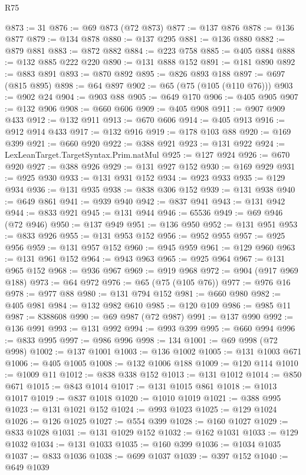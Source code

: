 \begin{lexlean}{R75}
\begin{coremodule}
@873 := 31
@876 := @69 @873 (@72 @873)
@877 := @137 @876
@878 := @136 @877
@879 := @134 @878
@880 := @137 @295
@881 := @136 @880
@882 := @879 @881
@883 := @872 @882
@884 := @223 @758
@885 := @405 @884
@888 := @132 @885 @222 @220
@890 := @131 @888 @152
@891 := @181 @890
@892 := @883 @891
@893 := @870 @892
@895 := @826 @893 @188
@897 := @697 (@815 @895)
@898 := @64 @897
@902 := @65 (@75 (@105 (@110 @76)))
@903 := @902 @24
@904 := @903 @88
@905 := @649 @170
@906 := @405 @905
@907 := @132 @906
@908 := @660 @606
@909 := @405 @908
@911 := @907 @909 @433
@912 := @132 @911
@913 := @670 @606
@914 := @405 @913
@916 := @912 @914 @433
@917 := @132 @916
@919 := @178 @103 @88
@920 := @169 @399
@921 := @660 @920
@922 := @388 @921
@923 := @131 @922
@924 := LexLeanTarget.TargetSyntax.Prim.natMul
@925 := @127 @924
@926 := @670 @920
@927 := @388 @926
@929 := @131 @927 @152
@930 := @169 @929
@931 := @925 @930
@933 := @131 @931 @152
@934 := @923 @933
@935 := @129 @934
@936 := @131 @935
@938 := @838 @306 @152
@939 := @131 @938
@940 := @649 @861
@941 := @939 @940
@942 := @837 @941
@943 := @131 @942
@944 := @833 @921
@945 := @131 @944
@946 := 65536
@949 := @69 @946 (@72 @946)
@950 := @137 @949
@951 := @136 @950
@952 := @131 @951
@953 := @833 @926
@955 := @131 @953 @152
@956 := @952 @955
@957 := @925 @956
@959 := @131 @957 @152
@960 := @945 @959
@961 := @129 @960
@963 := @131 @961 @152
@964 := @943 @963
@965 := @925 @964
@967 := @131 @965 @152
@968 := @936 @967
@969 := @919 @968
@972 := @904 (@917 @969 @188)
@973 := @64 @972
@976 := @65 (@75 (@105 @76))
@977 := @976 @16
@978 := @977 @88
@980 := @131 @794 @152
@981 := @660 @980
@982 := @405 @981
@984 := @132 @982 @610
@985 := @120 @109
@986 := @985 @11
@987 := 8388608
@990 := @69 @987 (@72 @987)
@991 := @137 @990
@992 := @136 @991
@993 := @131 @992
@994 := @993 @399
@995 := @660 @994
@996 := @833 @995
@997 := @986 @996
@998 := 134
@1001 := @69 @998 (@72 @998)
@1002 := @137 @1001
@1003 := @136 @1002
@1005 := @131 @1003 @671
@1006 := @405 @1005
@1008 := @132 @1006 @188
@1009 := @120 @114
@1010 := @1009 @11
@1012 := @838 @338 @152
@1013 := @131 @1012
@1014 := @850 @671
@1015 := @843 @1014
@1017 := @131 @1015 @861
@1018 := @1013 @1017
@1019 := @837 @1018
@1020 := @1010 @1019
@1021 := @388 @995
@1023 := @131 @1021 @152
@1024 := @993 @1023
@1025 := @129 @1024
@1026 := @126 @1025
@1027 := @554 @399
@1028 := @160 @1027
@1029 := @833 @1028
@1031 := @131 @1029 @152
@1032 := @162 @1031
@1033 := @129 @1032
@1034 := @131 @1033
@1035 := @160 @399
@1036 := @1034 @1035
@1037 := @833 @1036
@1038 := @699 @1037
@1039 := @397 @152
@1040 := @649 @1039

\end{coremodule}
\end{lexlean}
